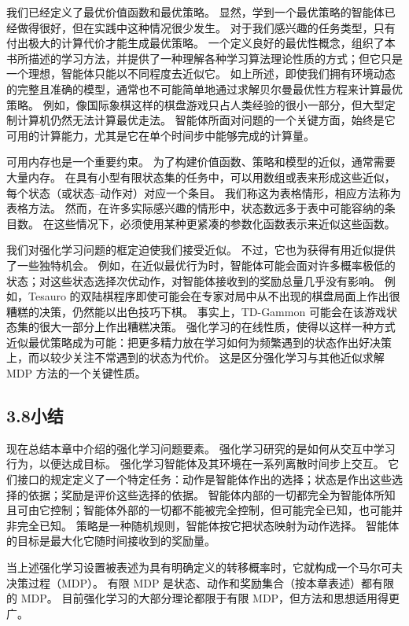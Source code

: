 \documentclass[UTF8, 12pt, fontset=fandol, oneside]{ctexart}
\begin{document}
我们已经定义了最优价值函数和最优策略。
显然，学到一个最优策略的智能体已经做得很好，但在实践中这种情况很少发生。
对于我们感兴趣的任务类型，只有付出极大的计算代价才能生成最优策略。
一个定义良好的最优性概念，组织了本书所描述的学习方法，并提供了一种理解各种学习算法理论性质的方式；但它只是一个理想，智能体只能以不同程度去近似它。
如上所述，即使我们拥有环境动态的完整且准确的模型，通常也不可能简单地通过求解贝尔曼最优性方程来计算最优策略。
例如，像国际象棋这样的棋盘游戏只占人类经验的很小一部分，但大型定制计算机仍然无法计算最优走法。
智能体所面对问题的一个关键方面，始终是它可用的计算能力，尤其是它在单个时间步中能够完成的计算量。

可用内存也是一个重要约束。
为了构建价值函数、策略和模型的近似，通常需要大量内存。
在具有小型有限状态集的任务中，可以用数组或表来形成这些近似，每个状态（或状态--动作对）对应一个条目。
我们称这为表格情形，相应方法称为表格方法。
然而，在许多实际感兴趣的情形中，状态数远多于表中可能容纳的条目数。
在这些情况下，必须使用某种更紧凑的参数化函数表示来近似这些函数。

我们对强化学习问题的框定迫使我们接受近似。
不过，它也为获得有用近似提供了一些独特机会。
例如，在近似最优行为时，智能体可能会面对许多概率极低的状态；对这些状态选择次优动作，对智能体接收到的奖励总量几乎没有影响。
例如，Tesauro 的双陆棋程序即使可能会在专家对局中从不出现的棋盘局面上作出很糟糕的决策，仍然能以出色技巧下棋。
事实上，TD-Gammon 可能会在该游戏状态集的很大一部分上作出糟糕决策。
强化学习的在线性质，使得以这样一种方式近似最优策略成为可能：把更多精力放在学习如何为频繁遇到的状态作出好决策上，而以较少关注不常遇到的状态为代价。
这是区分强化学习与其他近似求解 MDP 方法的一个关键性质。

\subsection*{3.8\quad 小结}

现在总结本章中介绍的强化学习问题要素。
强化学习研究的是如何从交互中学习行为，以便达成目标。
强化学习智能体及其环境在一系列离散时间步上交互。
它们接口的规定定义了一个特定任务：动作是智能体作出的选择；状态是作出这些选择的依据；奖励是评价这些选择的依据。
智能体内部的一切都完全为智能体所知且可由它控制；智能体外部的一切都不能被完全控制，但可能完全已知，也可能并非完全已知。
策略是一种随机规则，智能体按它把状态映射为动作选择。
智能体的目标是最大化它随时间接收到的奖励量。

当上述强化学习设置被表述为具有明确定义的转移概率时，它就构成一个马尔可夫决策过程（MDP）。
有限 MDP 是状态、动作和奖励集合（按本章表述）都有限的 MDP。
目前强化学习的大部分理论都限于有限 MDP，但方法和思想适用得更广。
\end{document}
